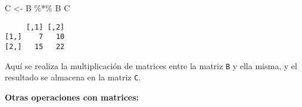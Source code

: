 \documentclass[
  a4paper,
]{article}
\newenvironment{Shaded}{}{}
\newcommand{\NormalTok}[1]{\textcolor[rgb]{0.14,0.16,0.18}{#1}}
\newcommand{\OtherTok}[1]{\textcolor[rgb]{0.44,0.26,0.76}{#1}}
\newcommand{\SpecialCharTok}[1]{\textcolor[rgb]{0.00,0.36,0.77}{#1}}
\begin{document}
\begin{enumerate}
\begin{Shaded}
\begin{Highlighting}[]
\NormalTok{C }\OtherTok{\textless{}{-}}\NormalTok{ B }\SpecialCharTok{\%*\%}\NormalTok{ B}
\NormalTok{C}
\end{Highlighting}
\end{Shaded}

\begin{verbatim}
     [,1] [,2]
[1,]    7   10
[2,]   15   22
\end{verbatim}

  Aquí se realiza la multiplicación de matrices entre la matriz
  \texttt{B} y ella misma, y el resultado se almacena en la matriz
  \texttt{C}.
\end{enumerate}

\textbf{Otras operaciones con matrices:}
\end{document}
